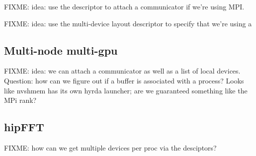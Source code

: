 \documentclass[12pt]{article}
\renewcommand{\(}{\left(}
\renewcommand{\)}{\right)}
\begin{document}
FIXME: idea: use the descriptor to attach a communicator if we're
using MPI.

FIXME: idea: use the multi-device layout descriptor to specify that
we're using a 

\subsection{Multi-node multi-gpu}

FIXME: idea: we can attach a communicator as well as a list of local
devices.  Question: how can we figure out if a buffer is associated
with a process?  Looks like nvshmem has its own hyrda launcher; are we
guaranteed something like the MPi rank?

\subsection{hipFFT}

FIXME: how can we get multiple devices per proc via the desciptors?


\end{document}
